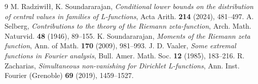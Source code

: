 \documentclass[12pt, reqno]{amsart}
\numberwithin{equation}{section}
\numberwithin{theorem}{section}
\numberwithin{equation}{section}
\begin{document}
\begin{thebibliography}{9}
M. Radziwi\l\l, K. Soundararajan, {\it Conditional lower bounds on the distribution of central values in families of L-functions}, Acta Arith. \textbf{214} (2024), 481--497.
\label{selberg}
A. Selberg, {\it Contributions to the theory of the Riemann zeta-function}, Arch. Math. Naturvid. \textbf{48} (1946), 89--155.
 \label{S}
K. Soundararajan, \textit{Moments of the Riemann zeta function}, Ann. of Math. \textbf{170} (2009), 981--993.
\label{V}
J. D. Vaaler, {\it Some extremal functions in Fourier analysis}, Bull. Amer. Math. Soc. \textbf{12} (1985), 183--216.
\label{Z}
R. Zacharias, {\it Simultaneous non-vanishing for Dirichlet L-functions}, Ann. Inst. Fourier (Grenoble) \textbf{69} (2019), 1459--1527.
\end{thebibliography}
\end{document}
